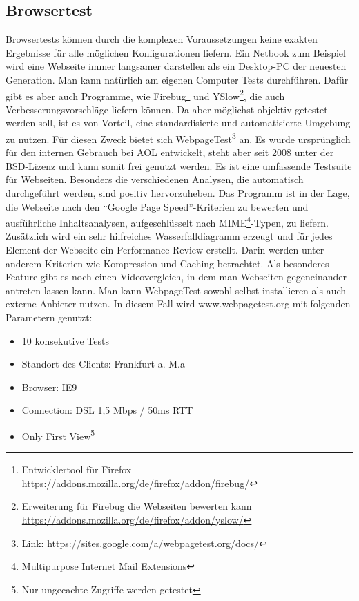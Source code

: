 \subsection{Browsertest}
Browsertests k\"onnen durch die komplexen Voraussetzungen keine exakten Ergebnisse f\"ur alle m\"oglichen Konfigurationen liefern. Ein Netbook zum Beispiel wird eine Webseite immer langsamer darstellen als ein Desktop-PC der neuesten Generation. Man kann natürlich am eigenen Computer Tests durchführen. Dafür gibt es aber auch Programme, wie Firebug\footnote{Entwicklertool f\"ur Firefox \url{https://addons.mozilla.org/de/firefox/addon/firebug/}} und YSlow\footnote{Erweiterung f\"ur Firebug die Webseiten bewerten kann \url{https://addons.mozilla.org/de/firefox/addon/yslow/}}, die auch Verbesserungsvorschläge liefern können. Da aber möglichst objektiv getestet werden soll, ist es von Vorteil, eine standardisierte und automatisierte Umgebung zu nutzen. Für diesen Zweck bietet sich WebpageTest\footnote{Link: \url{https://sites.google.com/a/webpagetest.org/docs/}} an. Es wurde ursprünglich für den internen Gebrauch bei AOL entwickelt, steht aber seit 2008 unter der BSD-Lizenz und kann somit frei genutzt werden. Es ist eine umfassende Testsuite für Webseiten. Besonders die verschiedenen Analysen, die automatisch durchgeführt werden, sind positiv hervorzuheben. Das Programm ist in der Lage, die Webseite nach den "`Google Page Speed"'-Kriterien zu bewerten und ausführliche Inhaltsanalysen, aufgeschlüsselt nach MIME\footnote{Multipurpose Internet Mail Extensions}-Typen, zu liefern. Zusätzlich wird ein sehr hilfreiches Wasserfalldiagramm erzeugt und für jedes Element der Webseite ein Performance-Review erstellt. Darin werden unter anderem Kriterien wie Kompression und Caching betrachtet. Als besonderes Feature gibt es noch einen Videovergleich, in dem man Webseiten gegeneinander antreten lassen kann. Man kann WebpageTest sowohl selbst installieren als auch externe Anbieter nutzen. In diesem Fall wird www.webpagetest.org mit folgenden Parametern genutzt:
\begin{itemize}
  \item 10 konsekutive Tests
  \item Standort des Clients: Frankfurt a. M.a
  \item Browser: IE9
  \item Connection: DSL 1,5 Mbps / 50ms RTT
  \item Only First View\footnote{Nur ungecachte Zugriffe werden getestet}
\end{itemize}

